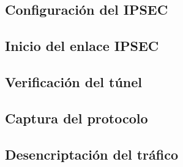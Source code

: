 \subsection{Configuración del IPSEC}

\subsection{Inicio del enlace IPSEC}

\subsection{Verificación del túnel}

\subsection{Captura del protocolo}

\subsection{Desencriptación del tráfico}
